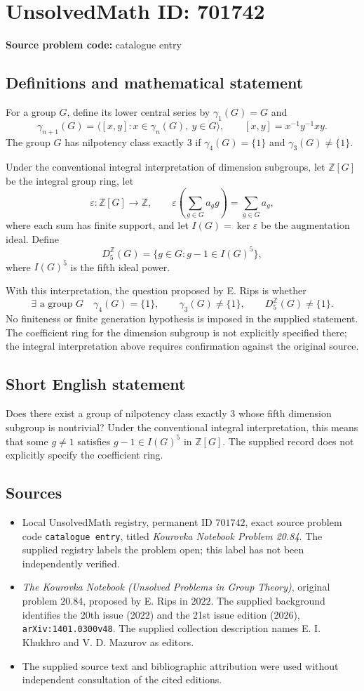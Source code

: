 \documentclass[11pt]{article}
\newcommand{\Z}{\mathbb{Z}}
\begin{document}
\section*{UnsolvedMath ID: 701742}
\textbf{Source problem code:} catalogue entry
\subsection{Definitions and mathematical statement}
For a group \(G\), define its lower central series by \(\gamma_1(G)=G\) and
\[
\gamma_{n+1}(G)=\langle [x,y]:x\in\gamma_n(G),\ y\in G\rangle,
\qquad [x,y]=x^{-1}y^{-1}xy.
\]
The group \(G\) has nilpotency class exactly \(3\) if \(\gamma_4(G)=\{1\}\) and \(\gamma_3(G)\ne\{1\}\).

Under the conventional integral interpretation of dimension subgroups, let \(\Z[G]\) be the integral group ring, let
\[
\varepsilon:\Z[G]\longrightarrow\Z,
\qquad \varepsilon\!\left(\sum_{g\in G}a_g g\right)=\sum_{g\in G}a_g,
\]
where each sum has finite support, and let \(I(G)=\ker\varepsilon\) be the augmentation ideal. Define
\[
D_5^{\Z}(G)=\{g\in G:g-1\in I(G)^5\},
\]
where \(I(G)^5\) is the fifth ideal power.

With this interpretation, the question proposed by E. Rips is whether
\[
\exists\text{ a group }G\quad
\gamma_4(G)=\{1\},\qquad
\gamma_3(G)\ne\{1\},\qquad
D_5^{\Z}(G)\ne\{1\}.
\]
No finiteness or finite generation hypothesis is imposed in the supplied statement. The coefficient ring for the dimension subgroup is not explicitly specified there; the integral interpretation above requires confirmation against the original source.
\subsection{Short English statement}
Does there exist a group of nilpotency class exactly \(3\) whose fifth dimension subgroup is nontrivial? Under the conventional integral interpretation, this means that some \(g\ne1\) satisfies \(g-1\in I(G)^5\) in \(\Z[G]\). The supplied record does not explicitly specify the coefficient ring.
\subsection{Sources}
\begin{itemize}
\item Local UnsolvedMath registry, permanent ID \(701742\), exact source problem code \texttt{catalogue entry}, titled \emph{Kourovka Notebook Problem 20.84}. The supplied registry labels the problem open; this label has not been independently verified.
\item \emph{The Kourovka Notebook (Unsolved Problems in Group Theory)}, original problem \(20.84\), proposed by E. Rips in \(2022\). The supplied background identifies the 20th issue (2022) and the 21st issue edition (2026), \texttt{arXiv:1401.0300v48}. The supplied collection description names E. I. Khukhro and V. D. Mazurov as editors.
\item The supplied source text and bibliographic attribution were used without independent consultation of the cited editions.
\end{itemize}
\end{document}

